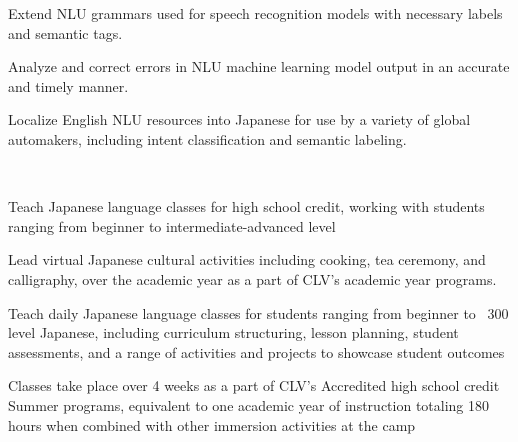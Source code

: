 \documentclass[letterpaper]{deedy-resume_sm} %
\begin{document}
\sectionspace %
\vspace{\topsep} %
\begin{tightitemize}
\item Extend NLU grammars used for speech recognition models with necessary labels and semantic tags.
\item Analyze and correct errors in NLU machine learning model output in an accurate and timely manner.
\item Localize English NLU resources into Japanese for use by a variety of global automakers, including intent classification and semantic labeling.   
\end{tightitemize}
\sectionspace %
\\
\vspace{\topsep} %
\begin{tightitemize}
\item Teach Japanese language classes for high school credit, working with students ranging from beginner to intermediate-advanced level
\item Lead virtual Japanese cultural activities including cooking, tea ceremony, and calligraphy, over the academic year as a part of CLV's academic year programs.
\end{tightitemize}
\vspace{\topsep} %
\begin{tightitemize}
\item Teach daily Japanese language classes for students ranging from beginner to ~300 level Japanese, including curriculum structuring, lesson planning, student assessments, and a range of activities and projects to showcase student outcomes
\item Classes take place over 4 weeks as a part of CLV's Accredited high school credit Summer programs, equivalent to one academic year of instruction totaling 180 hours when combined with other immersion activities at the camp
\end{tightitemize}
\end{document}
